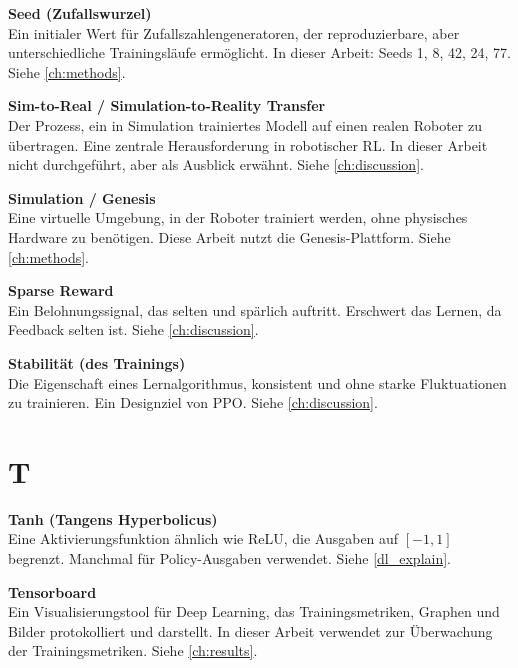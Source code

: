 \vspace{0.3cm}
\noindent\textbf{Seed (Zufallswurzel)} \\
Ein initialer Wert für Zufallszahlengeneratoren, der reproduzierbare, aber unterschiedliche Trainingsläufe ermöglicht. In dieser Arbeit: Seeds 1, 8, 42, 24, 77. Siehe \autoref{ch:methods}.

\vspace{0.5cm}
\noindent\textbf{Sim-to-Real / Simulation-to-Reality Transfer} \\
Der Prozess, ein in Simulation trainiertes Modell auf einen realen Roboter zu übertragen. Eine zentrale Herausforderung in robotischer RL. In dieser Arbeit nicht durchgeführt, aber als Ausblick erwähnt. Siehe \autoref{ch:discussion}.

\vspace{0.5cm}
\noindent\textbf{Simulation / Genesis} \\
Eine virtuelle Umgebung, in der Roboter trainiert werden, ohne physisches Hardware zu benötigen. Diese Arbeit nutzt die Genesis-Plattform. Siehe \autoref{ch:methods}.

\vspace{0.5cm}
\noindent\textbf{Sparse Reward} \\
Ein Belohnungssignal, das selten und spärlich auftritt. Erschwert das Lernen, da Feedback selten ist. Siehe \autoref{ch:discussion}.

\vspace{0.5cm}
\noindent\textbf{Stabilität (des Trainings)} \\
Die Eigenschaft eines Lernalgorithmus, konsistent und ohne starke Fluktuationen zu trainieren. Ein Designziel von PPO. Siehe \autoref{ch:discussion}.

\section*{T}

\vspace{0.3cm}
\noindent\textbf{Tanh (Tangens Hyperbolicus)} \\
Eine Aktivierungsfunktion ähnlich wie ReLU, die Ausgaben auf $[-1, 1]$ begrenzt. Manchmal für Policy-Ausgaben verwendet. Siehe \autoref{dl_explain}.

\vspace{0.5cm}
\noindent\textbf{Tensorboard} \\
Ein Visualisierungstool für Deep Learning, das Trainingsmetriken, Graphen und Bilder protokolliert und darstellt. In dieser Arbeit verwendet zur Überwachung der Trainingsmetriken. Siehe \autoref{ch:results}.


